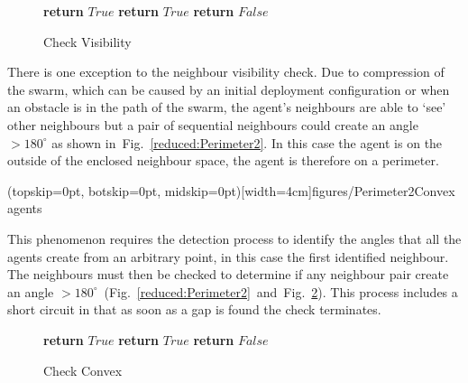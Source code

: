 \documentclass{ieeeaccess}
\begin{document}
\begin{figure}
\begin{algorithmic}[1]
{}
\State\textbf{return} $True$
   \EndIf
{}
\State\textbf{return} $True$
\EndIf
\EndFor
\State\textbf{return} $False$
\EndProcedure
\end{algorithmic}
\caption{Check Visibility}
\label{algo:CheckVisibility}
\end{figure}

There is one exception to the neighbour visibility check. Due to compression of the swarm, which can be caused by an initial deployment configuration or when an obstacle is in the path of the swarm, the agent's neighbours are able to `see' other neighbours but a pair of sequential neighbours could create an angle $> 180^\circ$ as shown in~Fig.~\ref{reduced:Perimeter2}. In this case the agent is on the outside of the enclosed neighbour space, the agent is therefore on a perimeter. 

\Figure[t!](topskip=0pt, botskip=0pt, midskip=0pt)[width=4cm]{figures/Perimeter2}{Convex agents\label{reduced:Perimeter2}}

This phenomenon requires the detection process to identify the angles that all the agents create from an arbitrary point, in this case the first identified neighbour. The neighbours must then be checked to determine if any neighbour pair create an angle $> 180^\circ$~(Fig.~\ref{reduced:Perimeter2}~and~Fig.~\ref{algo:CheckConvex}). This process includes a short circuit in that as soon as a gap is found the check terminates. 

\begin{figure}
\begin{algorithmic}[1]
{}
\State\textbf{return} $True$
\EndIf
\EndIf
{}
\State\textbf{return} $True$
\EndIf
\EndFor
\State\textbf{return} $False$
\EndProcedure
\end{algorithmic}
\caption{Check Convex}
\label{algo:CheckConvex}
\end{figure}
\end{document}
